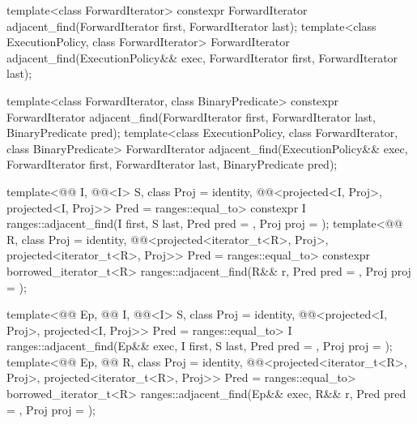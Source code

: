 %
\begin{itemdecl}
template<class ForwardIterator>
  constexpr ForwardIterator
    adjacent_find(ForwardIterator first, ForwardIterator last);
template<class ExecutionPolicy, class ForwardIterator>
  ForwardIterator
    adjacent_find(ExecutionPolicy&& exec,
                  ForwardIterator first, ForwardIterator last);

template<class ForwardIterator, class BinaryPredicate>
  constexpr ForwardIterator
    adjacent_find(ForwardIterator first, ForwardIterator last,
                  BinaryPredicate pred);
template<class ExecutionPolicy, class ForwardIterator, class BinaryPredicate>
  ForwardIterator
    adjacent_find(ExecutionPolicy&& exec,
                  ForwardIterator first, ForwardIterator last,
                  BinaryPredicate pred);

template<@@ I, @@<I> S, class Proj = identity,
         @@<projected<I, Proj>,
                                   projected<I, Proj>> Pred = ranges::equal_to>
  constexpr I ranges::adjacent_find(I first, S last, Pred pred = {}, Proj proj = {});
template<@@ R, class Proj = identity,
         @@<projected<iterator_t<R>, Proj>,
                                   projected<iterator_t<R>, Proj>> Pred = ranges::equal_to>
  constexpr borrowed_iterator_t<R> ranges::adjacent_find(R&& r, Pred pred = {}, Proj proj = {});

template<@@ Ep, @@ I, @@<I> S,
         class Proj = identity,
         @@<projected<I, Proj>,
                                   projected<I, Proj>> Pred = ranges::equal_to>
  I ranges::adjacent_find(Ep&& exec, I first, S last, Pred pred = {}, Proj proj = {});
template<@@ Ep, @@ R, class Proj = identity,
         @@<projected<iterator_t<R>, Proj>,
                                   projected<iterator_t<R>, Proj>> Pred = ranges::equal_to>
  borrowed_iterator_t<R>
    ranges::adjacent_find(Ep&& exec, R&& r, Pred pred = {}, Proj proj = {});
\end{itemdecl}

